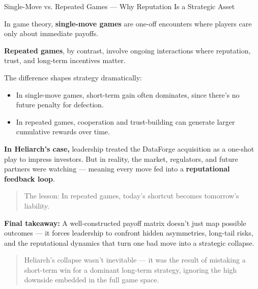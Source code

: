 \medskip

\begin{HistoricalSidebar}{Single-Move vs. Repeated Games --- Why Reputation Is a Strategic Asset}

In game theory, \textbf{single-move games} are one-off encounters where players care only about immediate payoffs.

\medskip

\textbf{Repeated games}, by contrast, involve ongoing interactions where reputation, trust, and long-term incentives matter.

\medskip

The difference shapes strategy dramatically:

\begin{itemize}
    \item In single-move games, short-term gain often dominates, since there’s no future penalty for defection.
    \item In repeated games, cooperation and trust-building can generate larger cumulative rewards over time.
\end{itemize}

\medskip

\textbf{In Heliarch’s case,} leadership treated the DataForge acquisition as a one-shot play to impress investors.  
But in reality, the market, regulators, and future partners were watching — meaning every move fed into a \textbf{reputational feedback loop}.

\medskip

\begin{quote}
    The lesson: In repeated games, today’s shortcut becomes tomorrow’s liability.
\end{quote}

\end{HistoricalSidebar}

\medskip

\textbf{Final takeaway:}  
A well-constructed payoff matrix doesn’t just map possible outcomes —  
it forces leadership to confront hidden asymmetries, long-tail risks, and the reputational dynamics that turn one bad move into a strategic collapse.

\begin{quote}
    Heliarch’s collapse wasn’t inevitable —  
    it was the result of mistaking a short-term win for a dominant long-term strategy,  
    ignoring the high downside embedded in the full game space.
\end{quote}

